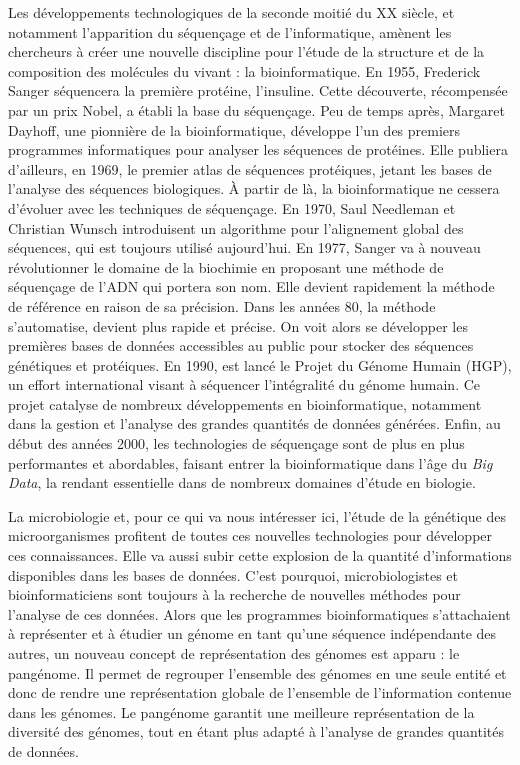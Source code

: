 Les développements technologiques de la seconde moitié du XX\ieme{} siècle, et notamment l'apparition du séquençage et de l'informatique, amènent les chercheurs à créer une nouvelle discipline pour l'étude de la structure et de la composition des molécules du vivant : la bioinformatique. En 1955, Frederick Sanger séquencera la première protéine, l'insuline. Cette découverte, récompensée par un prix Nobel, a établi la base du séquençage. Peu de temps après, Margaret Dayhoff, une pionnière de la bioinformatique, développe l'un des premiers programmes informatiques pour analyser les séquences de protéines. Elle publiera d'ailleurs, en 1969, le premier atlas de séquences protéiques, jetant les bases de l'analyse des séquences biologiques. À partir de là, la bioinformatique ne cessera d'évoluer avec les techniques de séquençage. En 1970, Saul Needleman et Christian Wunsch introduisent un algorithme pour l'alignement global des séquences, qui est toujours utilisé aujourd'hui. En 1977, Sanger va à nouveau révolutionner le domaine de la biochimie en proposant une méthode de séquençage de l'ADN qui portera son nom. Elle devient rapidement la méthode de référence en raison de sa précision. Dans les années 80, la méthode s'automatise, devient plus rapide et précise. On voit alors se développer les premières bases de données accessibles au public pour stocker des séquences génétiques et protéiques. En 1990, est lancé le Projet du Génome Humain (HGP), un effort international visant à séquencer l'intégralité du génome humain. Ce projet catalyse de nombreux développements en bioinformatique, notamment dans la gestion et l'analyse des grandes quantités de données générées. Enfin, au début des années 2000, les technologies de séquençage sont de plus en plus performantes et abordables, faisant entrer la bioinformatique dans l'âge du \textit{Big Data}, la rendant essentielle dans de nombreux domaines d'étude en biologie.

La microbiologie et, pour ce qui va nous intéresser ici, l'étude de la génétique des microorganismes profitent de toutes ces nouvelles technologies pour développer ces connaissances. Elle va aussi subir cette explosion de la quantité d'informations disponibles dans les bases de données. C'est pourquoi, microbiologistes et bioinformaticiens sont toujours à la recherche de nouvelles méthodes pour l'analyse de ces données. Alors que les programmes bioinformatiques s'attachaient à représenter et à étudier un génome en tant qu'une séquence indépendante des autres, un nouveau concept de représentation des génomes est apparu : le pangénome. Il permet de regrouper l'ensemble des génomes en une seule entité et donc de rendre une représentation globale de l'ensemble de l'information contenue dans les génomes. Le pangénome garantit une meilleure représentation de la diversité des génomes, tout en étant plus adapté à l'analyse de grandes quantités de données. 

